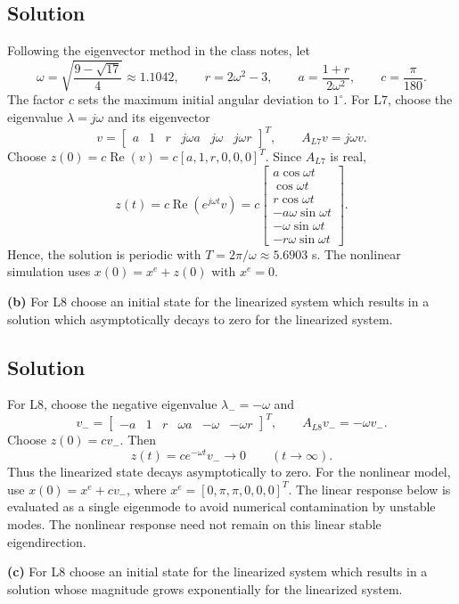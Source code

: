 \documentclass[12pt,a4paper]{article}
\begin{document}
\subsection*{Solution}
Following the eigenvector method in the class notes, let
\[
\omega=\sqrt{\frac{9-\sqrt{17}}{4}}\approx1.1042,\qquad
r=2\omega^2-3,\qquad a=\frac{1+r}{2\omega^2},\qquad c=\frac{\pi}{180}.
\]
The factor $c$ sets the maximum initial angular deviation to $1^\circ$.
For L7, choose the eigenvalue $\lambda=j\omega$ and its eigenvector
\[
v=\begin{bmatrix}a&1&r&j\omega a&j\omega&j\omega r\end{bmatrix}^{T},
\qquad A_{L7}v=j\omega v.
\]
Choose $z(0)=c\operatorname{Re}(v)=c[a,1,r,0,0,0]^T$. Since $A_{L7}$ is real,
\[
z(t)=c\operatorname{Re}(e^{j\omega t}v)
=c\begin{bmatrix}
a\cos\omega t\\\cos\omega t\\r\cos\omega t\\
-a\omega\sin\omega t\\-\omega\sin\omega t\\-r\omega\sin\omega t
\end{bmatrix}.
\]
Hence, the solution is periodic with $T=2\pi/\omega\approx5.6903$ s.
The nonlinear simulation uses $x(0)=x^e+z(0)$ with $x^e=0$.



\clearpage
\textbf{(b)} For L8 choose an initial state for the linearized system which results in a solution which asymptotically decays to zero for the linearized system.
\subsection*{Solution}
For L8, choose the negative eigenvalue $\lambda_-=-\omega$ and
\[
v_-=\begin{bmatrix}-a&1&r&\omega a&-\omega&-\omega r\end{bmatrix}^{T},
\qquad A_{L8}v_-=-\omega v_-.
\]
Choose $z(0)=cv_-$. Then
\[
z(t)=ce^{-\omega t}v_-\longrightarrow0\qquad(t\to\infty).
\]
Thus the linearized state decays asymptotically to zero.
For the nonlinear model, use $x(0)=x^e+cv_-$, where
$x^e=[0,\pi,\pi,0,0,0]^T$.
The linear response below is evaluated as a single eigenmode to avoid
numerical contamination by unstable modes. The nonlinear response need not
remain on this linear stable eigendirection.



\clearpage
\textbf{(c)} For L8 choose an initial state for the linearized system which results in a solution whose magnitude grows exponentially for the linearized system.
\end{document}
